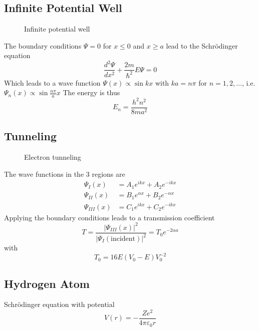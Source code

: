 \subsection{Infinite Potential Well}
\begin{figure}[ht!]
    \centering
    
    \caption{Infinite potential well}
\end{figure}
The boundary conditions $\Psi=0$ for $x\leq 0$ and $x\geq a$ lead to the Schrödinger equation
\begin{equation}
    \frac{d^2 \Psi}{d x^2} + \frac{2m}{\hbar^2} E \Psi = 0
\end{equation}
Which leads to a wave function $\Psi(x) \propto \sin kx$ with $ka=n\pi$ for $n=1,2,\ldots$, i.e. $\Psi_n(x) \propto \sin\frac{n\pi}{a}x$
The energy is thus
\begin{equation}
    E_n = \frac{h^2 n^2}{8 m a^2}
\end{equation}

\subsection{Tunneling}
\begin{figure}[ht!]
    \centering
    
    \caption{Electron tunneling}
\end{figure}

The wave functions in the 3 regions are
\begin{align}
    \Psi_{I}(x) &= A_1 e^{ikx} + A_2 e^{-ikx} \\
    \Psi_{II}(x) &= B_1 e^{\alpha x} + B_2 e^{-\alpha x} \\
    \Psi_{III}(x) &= C_1 e^{ikx} + C_2 e^{-ikx} 
\end{align}
Applying the boundary conditions leads to a transmission coefficient
\begin{equation}
    T = \frac{\left| \Psi_{III}(x) \right|^2}{\left| \Psi_{I}(\text{incident}) \right|^2} = T_0 e^{-2\alpha a}
\end{equation}
with
\begin{equation}
    T_0 = 16 E(V_0-E)V_0^{-2}
\end{equation}

\subsection{Hydrogen Atom}
Schrödinger equation with potential
\begin{equation}
    V(r) = -\frac{Z e^2}{4 \pi \varepsilon_0 r}
\end{equation}

